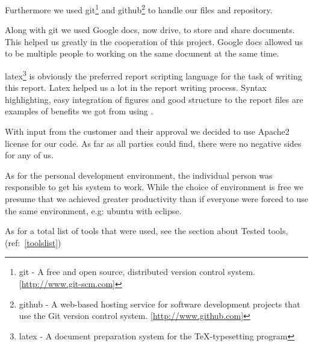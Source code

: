     Furthermore we used \gls{git}\footnote{\gls{git} - A free and open source, distributed version control system. [\url{http://www.git-scm.com}]} and \gls{github}\footnote{\gls{github} - A web-based hosting service for software development projects that use the Git version control system. [\url{http://www.github.com}]} to handle our files and repository. 
    
    Along with git we used Google docs, now drive, to store and share documents. This helped us greatly in the cooperation of this project. Google docs allowed us to be multiple people to working on the same document at the same time. 
    
    \gls{latex}\footnote{\gls{latex} - A document preparation system for the \TeX -typesetting program} is obviously the preferred report scripting language for the task of writing this report. Latex helped us a lot in the report writing process. Syntax highlighting, easy integration of figures and good structure to the report files are examples of benefits we got from using \Tex.
    
    With input from the customer and their approval we decided to use Apache2 license for our code. As far as all parties could find, there were no negative sides for any of us. 

    As for the personal development environment, the individual person was responsible to get his system to work. While the choice of environment is free we presume that we achieved greater productivity than if everyone were forced to use the same environment, e.g: ubuntu with eclipse.  

    As for a total list of tools that were used, see the section about Tested tools, (ref:~\ref{toolslist})    
    
